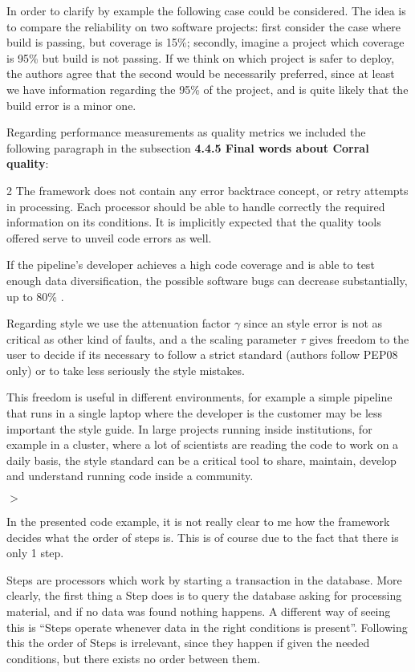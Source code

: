 \documentclass[a4paper,onecolumn,fleqn,usenatbib,useAMS]{mnrasr}
\newenvironment{frshaded}{%
\def\FrameCommand{\fboxrule=\FrameRule\fboxsep=\FrameSep \fcolorbox{framecolor}{shadecolor}}%
\MakeFramed {\FrameRestore}}%
{\endMakeFramed}
\newenvironment{myindentpar}[1]%
 {\begin{list}{}%
         \bigskip
         \color{refereecolor}
         {\setlength{\leftmargin}{#1}}%
         \itshape
         \item[$>$]%
 }
 {\end{list}}
\begin{document}
In order to clarify by example the following case could be considered.
%
The idea is to compare the reliability on two software projects:
first consider the case where build is passing, but coverage is 15\%; secondly,
imagine a project which coverage is 95\% but build is not passing. 
%
If we think on which project is safer to deploy, the authors agree 
that the second would be necessarily preferred, since at least we have
information regarding the 95\% of the project, and is quite likely that
the build error is a minor one.

Regarding performance measurements as quality metrics we included the following
paragraph in the subsection \textbf{4.4.5 Final words about Corral quality}:

\begin{frshaded}
\begin{multicols}{2}   
The framework does not contain any error backtrace concept, or retry attempts in
processing. 
%
Each processor should be able to handle correctly the required information on its conditions.
%
It is implicitly expected that the quality tools offered serve to unveil code errors as well.

If the pipeline's developer achieves a high code coverage and is able to test enough data
diversification, the possible software bugs can decrease substantially, up to 80\% \citep{jeffries2007guest}.
%
\end{multicols} \end{frshaded} 

Regarding style we use the attenuation factor $\gamma$
since an style error is not as critical as other kind
of faults, and a the scaling parameter $\tau$ 
gives freedom to the user to decide if its necessary
to follow a strict standard (authors follow PEP08 only) or to take less
seriously the style mistakes. 

This freedom is useful in different environments,
for example a simple pipeline that runs in a single laptop where the developer
is the customer may be less important the style guide.
%
In large projects running inside institutions, for 
example in a cluster, where a lot of scientists are reading the
code to work on a daily basis, the style standard can be a critical tool to
share, maintain, develop and understand running code inside a community.


\begin{myindentpar}{1cm}
 In the presented code example, it is not really
clear to me how the framework decides what the order of steps is. This
is of course due to the fact that there is only 1 step. 
 
\end{myindentpar}
%
Steps are processors which work by starting a transaction in the database.
%
More clearly, the first thing a Step does is to query the database asking 
for processing material, and if no data was found nothing happens.
%
A different way of seeing this is ``Steps operate whenever data in the 
right conditions is present''. 
%
Following this the order of Steps is irrelevant, since they happen if given 
the needed conditions, but there exists no order between them.
\end{document}
